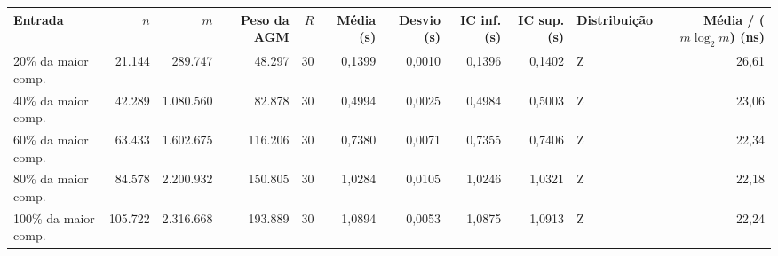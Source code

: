 \begin{tabular}{lrrrrrrrrlr}
\toprule
Entrada & $n$ & $m$ & Peso da AGM & $R$ & Média (s) & Desvio (s) & IC inf. (s) & IC sup. (s) & Distribuição & Média / ($m \log_2 m$) (ns) \\
\midrule
20\% da maior comp. & 21.144 & 289.747 & 48.297 & 30 & 0,1399 & 0,0010 & 0,1396 & 0,1402 & Z & 26,61 \\
40\% da maior comp. & 42.289 & 1.080.560 & 82.878 & 30 & 0,4994 & 0,0025 & 0,4984 & 0,5003 & Z & 23,06 \\
60\% da maior comp. & 63.433 & 1.602.675 & 116.206 & 30 & 0,7380 & 0,0071 & 0,7355 & 0,7406 & Z & 22,34 \\
80\% da maior comp. & 84.578 & 2.200.932 & 150.805 & 30 & 1,0284 & 0,0105 & 1,0246 & 1,0321 & Z & 22,18 \\
100\% da maior comp. & 105.722 & 2.316.668 & 193.889 & 30 & 1,0894 & 0,0053 & 1,0875 & 1,0913 & Z & 22,24 \\
\bottomrule
\end{tabular}
